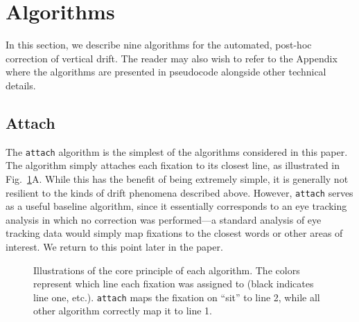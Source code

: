 \documentclass[doc,biblatex]{apa7}
\begin{document}
\section{Algorithms}

In this section, we describe nine algorithms for the automated, post-hoc correction of vertical drift. The reader may also wish to refer to the Appendix where the algorithms are presented in pseudocode alongside other technical details.

\subsection{Attach}

The \texttt{attach} algorithm is the simplest of the algorithms considered in this paper. The algorithm simply attaches each fixation to its closest line, as illustrated in Fig.~\ref{fig02}A. While this has the benefit of being extremely simple, it is generally not resilient to the kinds of drift phenomena described above. However, \texttt{attach} serves as a useful baseline algorithm, since it essentially corresponds to an eye tracking analysis in which no correction was performed---a standard analysis of eye tracking data would simply map fixations to the closest words or other areas of interest. We return to this point later in the paper.

	\begin{figure}
	\vspace*{2pt}
	\caption{Illustrations of the core principle of each algorithm. The colors represent which line each fixation was assigned to (black indicates line one, etc.). \texttt{attach} maps the fixation on ``sit'' to line 2, while all other algorithm correctly map it to line 1.}
	\label{fig02}
	\end{figure}
\end{document}
